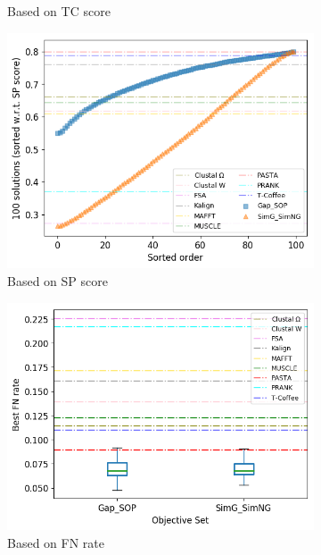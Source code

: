 \begin{figure}[!htbp]
\begin{adjustwidth}{-1.5cm}{-1.5cm}
\begin{subfigure}{0.75\columnwidth}
			\caption{Based on TC score}
		\end{subfigure}
		\begin{subfigure}{0.75\columnwidth}
			\includegraphics[width=\columnwidth]{Figure/summary/precomputedInit/avg_sp_density}
			\caption{Based on SP score}
		\end{subfigure}
		\begin{subfigure}{0.75\columnwidth}
			\includegraphics[width=\columnwidth]{Figure/summary/precomputedInit/avg_objset_fnrate_rank}
			\caption{Based on FN rate}
		\end{subfigure}	
		\begin{subfigure}{0.75\columnwidth}

\end{subfigure}
\end{adjustwidth}
\end{figure}
